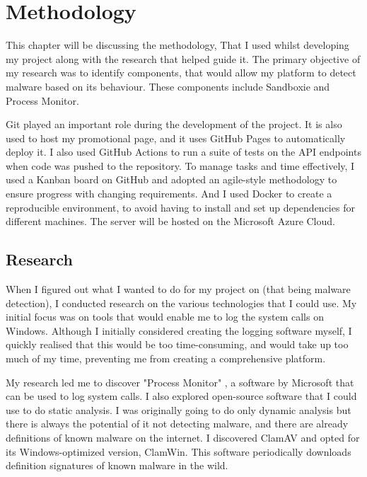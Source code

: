 \chapter{Methodology}

This chapter will be discussing the methodology,
That I used whilst developing my project
along with the research that helped guide it.
The primary objective of my research was to identify components,
that would allow my platform to detect malware based on its behaviour.
These components include Sandboxie and Process Monitor.

Git played an important role during the development of the project.
It is also used to host my promotional page,
and it uses GitHub Pages to automatically deploy it.
I also used GitHub Actions to run a suite of tests on the
API endpoints when code was pushed to the repository.
To manage tasks and time effectively, I used a Kanban board on GitHub
and adopted an agile-style methodology to ensure
progress with changing requirements.
And I used Docker to create a reproducible environment,
to avoid having to install and set up dependencies for different machines.
The server will be hosted on the Microsoft Azure Cloud.

\section{Research}
When I figured out what I wanted to do for my project on
(that being malware detection),
I conducted research on the various technologies that I could use.
My initial focus was on tools that would enable me
to log the system calls on Windows.
Although I initially considered creating the logging software myself,
I quickly realised that this would be too time-consuming,
and would take up too much of my time,
preventing me from creating a comprehensive platform.

My research led me to discover "Process Monitor" \cite{procmon},
a software by Microsoft that can be used to log system calls.
I also explored open-source software that
I could use to do static analysis.
I was originally going to do only dynamic analysis
but there is always the potential of it not detecting malware,
and there are already definitions of known malware on the internet.
I discovered ClamAV and opted for its Windows-optimized version, ClamWin.
This software periodically downloads definition signatures
of known malware in the wild.

